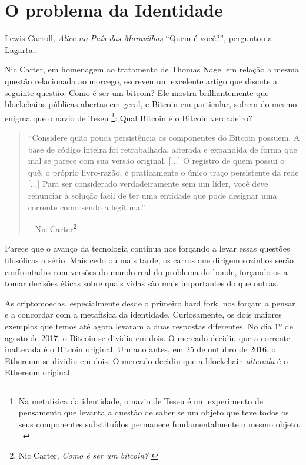 \chapter{O problema da Identidade}
\label{les:4}

\begin{chapquote}{Lewis Carroll, \textit{Alice no País das Maravilhas}}
  \enquote{Quem é você?}, perguntou a Lagarta..
\end{chapquote}

Nic Carter, em homenagem ao tratamento de Thomas Nagel em relação a mesma questão relacionada ao morcego, escreveu um excelente artigo que discute a seguinte questão: Como é ser um bitcoin? Ele mostra brilhantemente que blockchains públicas abertas em geral, e Bitcoin em particular, sofrem do mesmo enigma que o navio de Teseu \footnote{Na metafísica da identidade, o navio de Teseu é um experimento de pensamento que levanta a questão de saber se um objeto que teve todos os seus componentes substituídos permanece fundamentalmente o mesmo objeto. ~\cite{wiki: theseus}}: Qual Bitcoin é o Bitcoin verdadeiro?

\begin{quotation}\begin{samepage}
\enquote{Considere quão pouca persistência os componentes do Bitcoin possuem. A base de código inteira foi retrabalhada, alterada e expandida de forma que mal se parece com sua versão original. [...] O registro de quem possui o quê, o próprio livro-razão, é praticamente o único traço persistente da rede [...] Para ser considerado verdadeiramente sem um líder, você deve renunciar à solução fácil de ter uma entidade que pode designar uma corrente como sendo a legítima.}
\begin{flushright} -- Nic Carter\footnote{Nic Carter, \textit{Como é ser um bitcoin?} \cite{bitcoin-identity}}
\end{flushright}\end{samepage}\end{quotation}

Parece que o avanço da tecnologia continua nos forçando a levar essas questões filosóficas a sério. Mais cedo ou mais tarde, os carros que dirigem sozinhos serão confrontados com versões do mundo real do problema do bonde, forçando-os a tomar decisões éticas sobre quais vidas são mais importantes do que outras.

As criptomoedas, especialmente desde o primeiro hard fork, nos forçam a pensar e a concordar com a metafísica da identidade. Curiosamente, os dois maiores exemplos que temos até agora levaram a duas respostas diferentes. No dia 1º de agosto de 2017, o Bitcoin se dividiu em dois. O mercado decidiu que a corrente inalterada é o Bitcoin original. Um ano antes, em 25 de outubro de 2016, o Ethereum se dividiu em dois. O mercado decidiu que a blockchain \textit{alterada} é o Ethereum original.

